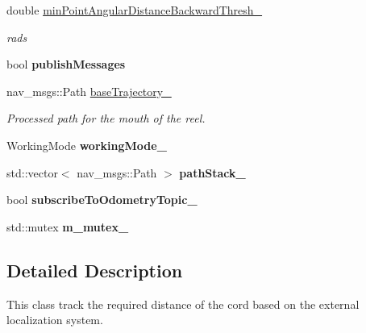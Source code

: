 \begin{DoxyCompactItemize}
\mbox{\label{classsmacc__odom__tracker_1_1OdomTracker_ac7cac171a63c8981f8233f71c94d0776}} 
double \hyperlink{classsmacc__odom__tracker_1_1OdomTracker_ac7cac171a63c8981f8233f71c94d0776}{min\+Point\+Angular\+Distance\+Backward\+Thresh\+\_\+}
\begin{DoxyCompactList}\small\item\em rads \end{DoxyCompactList}\item 
\mbox{\label{classsmacc__odom__tracker_1_1OdomTracker_a5aaa7b76cae6ed70524d0f2ac04cbe70}} 
bool {\bfseries publish\+Messages}
\item 
\mbox{\label{classsmacc__odom__tracker_1_1OdomTracker_ac3a17be46ab833632c5f63e75c840dc7}} 
nav\+\_\+msgs\+::\+Path \hyperlink{classsmacc__odom__tracker_1_1OdomTracker_ac3a17be46ab833632c5f63e75c840dc7}{base\+Trajectory\+\_\+}
\begin{DoxyCompactList}\small\item\em Processed path for the mouth of the reel. \end{DoxyCompactList}\item 
\mbox{\label{classsmacc__odom__tracker_1_1OdomTracker_ad011432ae35a533fd61bae43179c3c36}} 
Working\+Mode {\bfseries working\+Mode\+\_\+}
\item 
\mbox{\label{classsmacc__odom__tracker_1_1OdomTracker_a6cdd5d1199cf4638d70a2232081ac076}} 
std\+::vector$<$ nav\+\_\+msgs\+::\+Path $>$ {\bfseries path\+Stack\+\_\+}
\item 
\mbox{\label{classsmacc__odom__tracker_1_1OdomTracker_a394c4040c01f687c427d34c0ab50ba3e}} 
bool {\bfseries subscribe\+To\+Odometry\+Topic\+\_\+}
\item 
\mbox{\label{classsmacc__odom__tracker_1_1OdomTracker_ad65e52bfd236e073940808c35f2bed8c}} 
std\+::mutex {\bfseries m\+\_\+mutex\+\_\+}
\end{DoxyCompactItemize}


\subsection{Detailed Description}
This class track the required distance of the cord based on the external localization system. 

